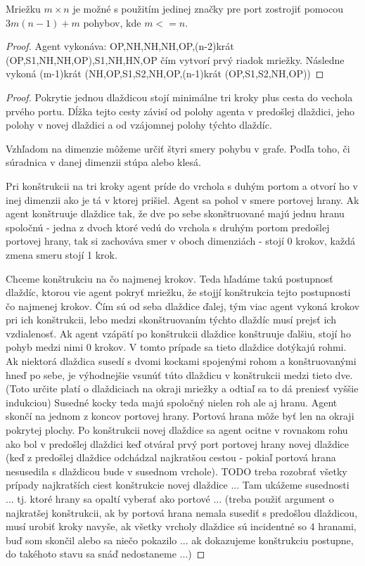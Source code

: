 \begin{lem}
Mriežku $m \times n$ je možné s použitím jedinej značky pre port zostrojiť
pomocou $3m(n - 1) + m$ pohybov, kde $m <= n$.
\end{lem}
\begin{proof}
Agent vykonáva: OP,NH,NH,NH,OP,(n-2)krát (OP,S1,NH,NH,OP),S1,NH,HN,OP čím
vytvorí prvý riadok mriežky. Následne vykoná
(m-1)krát (NH,OP,S1,S2,NH,OP,(n-1)krát (OP,S1,S2,NH,OP))
\end{proof}

\begin{proof}
Pokrytie jednou dlaždicou stojí minimálne tri kroky plus cesta do vechola
prvého portu. Dĺžka tejto cesty závisí od polohy agenta v predošlej
dlaždici, jeho polohy v novej dlaždici a od vzájomnej polohy týchto dlaždíc. 

Vzhľadom na dimenzie môžeme určiť štyri smery pohybu v grafe. Podľa toho, či
súradnica v danej dimenzii stúpa alebo klesá.

Pri konštrukcii na tri kroky agent príde do vrchola s duhým portom a otvorí
ho v inej dimenzii ako je tá v ktorej prišiel. Agent sa pohol v smere
portovej hrany.
Ak agent konštruuje dlaždice tak, že dve po sebe skonštruované majú jednu 
hranu spoločnú - jedna z dvoch ktoré vedú do vrchola s druhým portom
predošlej portovej hrany, tak si zachováva smer v oboch dimenziách - stojí 0
krokov, každá zmena smeru stojí 1 krok.

Chceme konštrukciu na čo najmenej krokov. Teda hľadáme takú postupnosť
dlaždíc, ktorou vie agent pokryť mriežku, že stojjí konštrukcia tejto
postupnosti čo najmenej krokov.
Čím sú od seba dlaždice ďalej, tým viac agent vykoná krokov pri ich
konštrukcii, lebo medzi skonštruovaním týchto dlaždíc musí prejsť ich
vzdialenosť.
Ak agent vzápätí po konštrukcii dlaždice konštruuje ďalšiu, stojí ho pohyb
medzi nimi 0 krokov. V tomto prípade sa tieto dlaždice dotýkajú rohmi.
Ak niektorá dlaždica susedí s dvomi kockami spojenými rohom a konštruovanými
hneď po sebe, je výhodnejšie vsunúť túto dlaždicu v konštrukcii medzi tieto
dve. (Toto určite platí o dlaždiciach na okraji mriežky a odtiaľ sa to dá
preniesť vyššie indukciou)
Susedné kocky teda majú spoločný nielen roh ale aj hranu. Agent skončí na
jednom z koncov portovej hrany. Portová hrana môže byť len na okraji
pokrytej plochy.
Po konštrukcii novej dlaždice sa agent ocitne v rovnakom rohu ako bol v
predošlej dlaždici keď otváral prvý port portovej hrany novej dlaždice (keď
z predošlej dlaždice odchádzal najkratšou cestou - pokiaľ portová hrana
nesusedila s dlaždicou bude v susednom vrchole).
TODO treba rozobrať všetky prípady najkratších ciest konštrukcie novej
dlaždice ...
Tam ukážeme susednosti ... tj. ktoré hrany sa opaltí vyberať ako portové ...
(treba použiť argument o najkratšej konštrukcii, ak by portová hrana nemala
susediť s predošlou dlaždicou, musí urobiť kroky navyše, ak všetky vrcholy
dlaždice sú incidentné so 4 hranami, buď som skončil alebo sa niečo pokazilo
... ak dokazujeme konštrukciu postupne, do takéhoto stavu sa snáď
nedostaneme ...) 


\end{proof}

